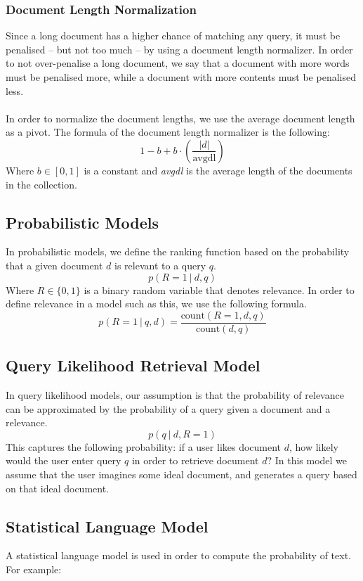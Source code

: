 \documentclass{article}
\begin{document}
\subsubsection{Document Length Normalization}
Since a long document has a higher chance of matching any query, it must be penalised -- but not too much -- by using a document length normalizer. In order to not over-penalise a long document, we say that a document with more words must be penalised more, while a document with more contents must be penalised less. \\ \\
In order to normalize the document lengths, we use the average document length as a pivot. The formula of the document length normalizer is the following:
\[ 1 - b + b \cdot \left( \frac{|d|}{\text{avgdl}} \right) \]
Where $b \in [0, 1]$ is a constant and \textit{avgdl} is the average length of the documents in the collection.

\subsection{Probabilistic Models}
In probabilistic models, we define the ranking function based on the probability that a given document $d$ is relevant to a query $q$.
\[ p(R = 1~|~d,q) \]
Where $R \in \{ 0,1 \}$ is a binary random variable that denotes relevance. In order to define relevance in a model such as this, we use the following formula.
\[ p(R=1~|~q,d) = \frac{\text{count}(R=1, d,q)}{\text{count}(d,q)} \]

\subsection{Query Likelihood Retrieval Model}
In query likelihood models, our assumption is that the probability of relevance can be approximated by the probability of a query given a document and a relevance.
\[ p(q~|~d, R=1) \]
This captures the following probability: if a user likes document $d$, how likely would the user enter query $q$ in order to retrieve document $d$? In this model we assume that the user imagines some ideal document, and generates a query based on that ideal document.

\subsection{Statistical Language Model}
A statistical language model is used in order to compute the probability of text. For example:
\end{document}
